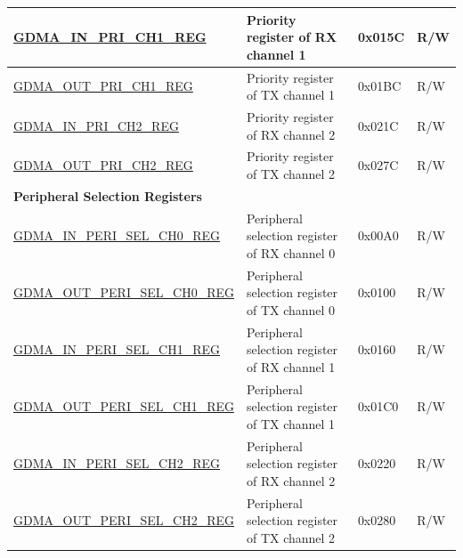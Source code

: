 \begin{longtable}{ | p{6.7cm} | p{6cm} | p{1.3cm} | p{1.5cm} | }
\hyperref[regdesc:GDMAINPRICHNREG]{GDMA\_IN\_PRI\_CH1\_REG} & Priority register of RX channel 1 & 0x015C & R/W \\ \hline
\hyperref[regdesc:GDMAOUTPRICHNREG]{GDMA\_OUT\_PRI\_CH1\_REG} & Priority register of TX channel 1 & 0x01BC & R/W \\ \hline
\hyperref[regdesc:GDMAINPRICHNREG]{GDMA\_IN\_PRI\_CH2\_REG} & Priority register of RX channel 2 & 0x021C & R/W \\ \hline
\hyperref[regdesc:GDMAOUTPRICHNREG]{GDMA\_OUT\_PRI\_CH2\_REG} & Priority register of TX channel 2 & 0x027C & R/W \\ \hline
\multicolumn{4}{|l|}{\textbf{Peripheral Selection Registers}} \\ \hline
\hyperref[regdesc:GDMAINPERISELCHNREG]{GDMA\_IN\_PERI\_SEL\_CH0\_REG} & Peripheral selection register of RX channel 0 & 0x00A0 & R/W \\ \hline
\hyperref[regdesc:GDMAOUTPERISELCHNREG]{GDMA\_OUT\_PERI\_SEL\_CH0\_REG} & Peripheral selection register of TX channel 0 & 0x0100 & R/W \\ \hline
\hyperref[regdesc:GDMAINPERISELCHNREG]{GDMA\_IN\_PERI\_SEL\_CH1\_REG} & Peripheral selection register of RX channel 1 & 0x0160 & R/W \\ \hline
\hyperref[regdesc:GDMAOUTPERISELCHNREG]{GDMA\_OUT\_PERI\_SEL\_CH1\_REG} & Peripheral selection register of TX channel 1 & 0x01C0 & R/W \\ \hline
\hyperref[regdesc:GDMAINPERISELCHNREG]{GDMA\_IN\_PERI\_SEL\_CH2\_REG} & Peripheral selection register of RX channel 2 & 0x0220 & R/W \\ \hline
\hyperref[regdesc:GDMAOUTPERISELCHNREG]{GDMA\_OUT\_PERI\_SEL\_CH2\_REG} & Peripheral selection register of TX channel 2 & 0x0280 & R/W \\ \hline
\end{longtable}

